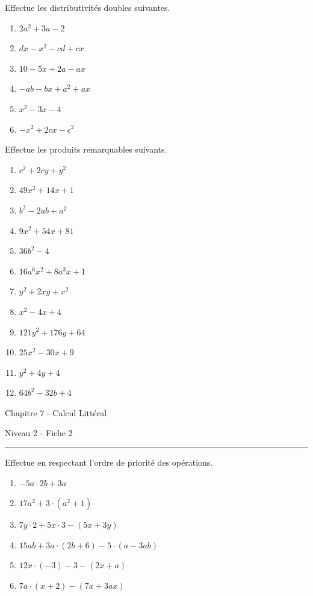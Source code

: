 \documentclass[12pt,parskip=half-, twoside=semi]{scrartcl}
\begin{document}
\begin{exercise}Effectue les distributivités doubles suivantes.
  \begin{enumerate}[cols=3]
    \item $2a^2+3a-2$
    \item $dx-x^2-cd+cx$
    \item $10-5x+2a-ax$
    \item $-ab-bx+a^2+ax$
    \item $x^2-3x-4$
    \item $-x^2+2cx-c^2$
  \end{enumerate}
\end{exercise}

\begin{exercise}Effectue les produits remarquables suivants.
  \begin{enumerate}[cols=3]
      \item $c^2+2cy+y^2$
      \item $49x^2+14x+1$
      \item $b^2-2ab+a^2$
      \item $9x^2+54x+81$
      \item $36b^2-4$
      \item $16a^6x^2+8a^3x+1$
      \item $y^2+2xy+x^2$
      \item $x^2-4x+4$
      \item $121y^2+176y+64$
      \item $25x^2-30x+9$
      \item $y^2+4y+4$
      \item $64b^2-32b+4$
  \end{enumerate}
\end{exercise}


\begin{center}
  \bfseries
  \begin{Huge}
    Chapitre 7 - Calcul Littéral
  \end{Huge}
  \smallbreak
  \begin{large}
    Niveau 2  - Fiche 2
  \end{large}
  \smallbreak
  \rule[10pt]{.5\linewidth}{1 pt}
\end{center}

\setcounter{exercise}{0}

\begin{exercise}Effectue en respectant l'ordre de priorité des opérations.
  \begin{enumerate}[cols=2]
    \item $-5 a \cdot 2 b+3 a$
    \item $17 a^2+3 \cdot\left(a^2+1\right)$
    \item $7 y \cdot 2+5 x \cdot 3-(5 x+3 y)$
    \item $15 a b+3 a \cdot(2 b+6)-5 \cdot(a-3 a b)$
    \item $12 x \cdot(-3)-3-(2 x+a)$
    \item $7 a \cdot(x+2)-(7 x+3 a x)$
  \end{enumerate}
\end{exercise}
\end{document}
